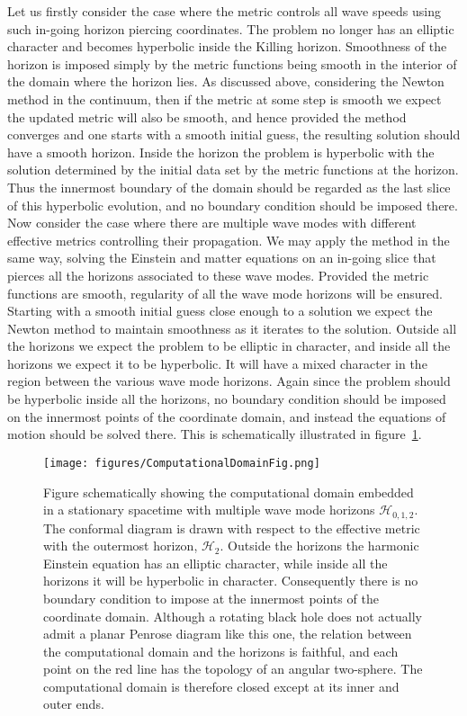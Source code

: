 \documentclass[12pt]{article}
\numberwithin{equation}{section}
\begin{document}
Let us firstly consider the case where the metric controls all wave speeds using such in-going horizon piercing coordinates. The problem no longer has an elliptic character and becomes hyperbolic inside the Killing horizon. Smoothness of the horizon is imposed simply by the metric functions being smooth in the interior of the domain where the horizon lies. 
As discussed above, considering the Newton method in the continuum, then if the metric at some step is smooth we expect the updated metric will also be smooth, and hence provided the method converges and one starts with a smooth initial guess, the resulting solution should have a smooth horizon.
Inside the horizon the problem is hyperbolic with the solution determined by the initial data set by the metric functions at the horizon. Thus the innermost boundary of the domain should be regarded as the last slice of this hyperbolic evolution, and no boundary condition should be imposed there. 
Now consider the case where there are multiple wave modes with different effective metrics controlling their propagation. We may apply the method in the same way, solving the Einstein and matter equations on an in-going slice that pierces all the horizons associated to these wave modes. Provided the metric functions are smooth, regularity of all the wave mode horizons will be ensured. Starting with a smooth initial guess close enough to a solution we expect the Newton method to maintain smoothness as it iterates to the solution. Outside all the horizons we expect the problem to be elliptic in character, and inside all the horizons we expect it to be hyperbolic. It will have a mixed character in the region between the various wave mode horizons. Again since the problem should be hyperbolic inside all the horizons, no boundary condition should be imposed on the innermost points of the coordinate domain, and instead the equations of motion should be solved there.
This is schematically illustrated in figure~\ref{fig:ingoing}.


\begin{figure}
\centerline{
  \texttt{[image: figures/ComputationalDomainFig.png]}
  }
  \caption{\label{fig:ingoing}
  Figure schematically showing the computational domain embedded in a stationary spacetime with multiple wave mode horizons $\mathcal{H}_{0,1,2}$. The conformal diagram is drawn with respect to the effective metric with the outermost horizon, $\mathcal{H}_{2}$. Outside the horizons the harmonic Einstein equation has an elliptic character, while inside all the horizons it will be hyperbolic in character. Consequently there is no boundary condition to impose at the innermost points of the coordinate domain. 
Although a rotating black hole does not actually admit a planar Penrose diagram like this one, the relation between the computational domain and the horizons is faithful, and each point on the red line has the topology of an angular two-sphere. The computational 
  domain is therefore closed except at its inner and outer ends.}
\end{figure}
\end{document}

